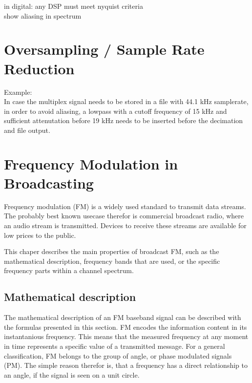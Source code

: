 in digital: any DSP must meet nyquist criteria \\
show aliasing in spectrum\\

\section{Oversampling / Sample Rate Reduction}
Example: \\
In case the multiplex signal needs to be stored in a file with 44.1 kHz samplerate, in order to avoid aliasing, a lowpass with a cutoff frequency of 15 kHz and sufficient attenutation before 19 kHz needs to be inserted before the decimation and file output.

\section{Frequency Modulation in Broadcasting}

Frequency modulation (FM) is a widely used standard to transmit data streams.
The probably best known usecase therefor is commercial broadcast radio, where an audio stream is transmitted.
Devices to receive these streams are available for low prices to the public.

This chaper describes the main properties of broadcast FM, such as the mathematical description, frequency bands that are used, or the specific frequency parts within a channel spectrum.

\subsection{Mathematical description}

The mathematical description of an FM baseband signal can be described with the formulas presented in this section.
FM encodes the information content in its instantanious frequency.
This means that the measured frequency at any moment in time represents a specific value of a transmitted message.
For a general classification, FM belongs to the group of angle, or phase modulated signals (PM).
The simple reason therefor is, that a frequency has a direct relationship to an angle, if the signal is seen on a unit circle.\\

